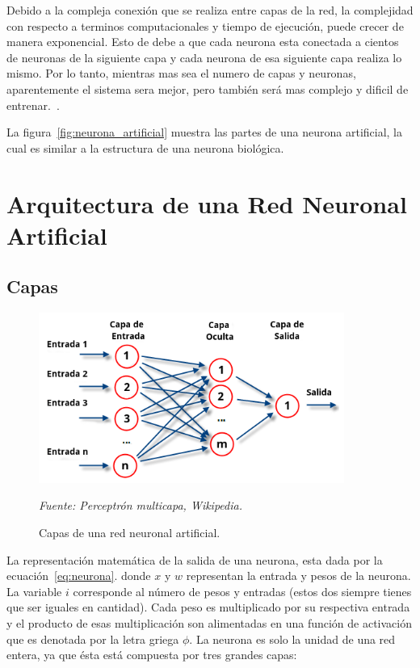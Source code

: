 Debido a la compleja conexión que se realiza entre capas de la red, la complejidad con respecto a terminos computacionales y tiempo de ejecución, puede crecer de manera exponencial. Esto de debe a que cada neurona esta conectada a cientos de neuronas de la siguiente capa y cada neurona de esa siguiente capa realiza lo mismo. Por lo tanto, mientras mas sea el numero de capas y neuronas, aparentemente el sistema sera mejor, pero también será mas complejo y dificil de entrenar.~\cite{21RedesNeuronales}.

La figura~\ref{fig:neurona_artificial} muestra las partes de una neurona artificial, la cual es similar a la estructura de una neurona biológica.


\section{Arquitectura de una Red Neuronal Artificial}
\subsection{Capas}

\begin{figure}[H]
		\centering
		\includegraphics[width=100mm]{Imagenes/capas_red_neuronal.png}
		\caption{Capas de una red neuronal artificial.}
		\vspace{0.15cm}
		\textit{Fuente: Perceptrón multicapa, Wikipedia.}
		\label{fig:capa_red_neuronal}
\end{figure} 

La representación matemática de la salida de una neurona, esta dada por la ecuación~\ref{eq:neurona}. donde $x$ y $w$ representan la entrada y pesos de la neurona. La variable $i$ corresponde al número de pesos y entradas (estos dos siempre tienes que ser iguales en cantidad). Cada peso es multiplicado por su respectiva entrada y el producto de esas multiplicación son alimentadas en una función de activación que es denotada por la letra griega $\phi$. La neurona es solo la unidad de una red entera, ya que ésta está compuesta por tres grandes capas:

